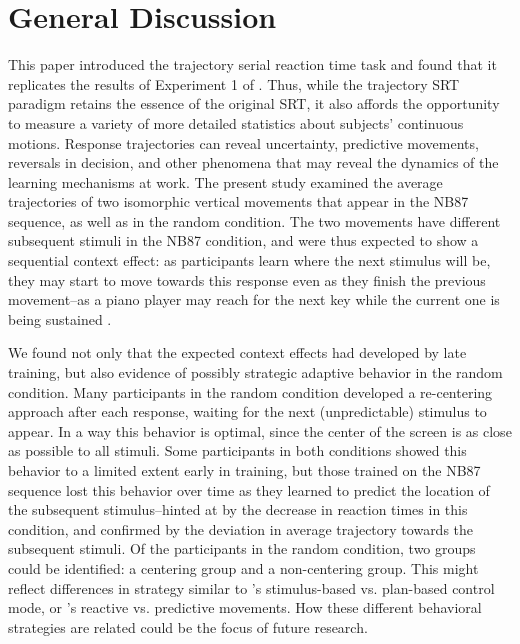 \documentclass[man,floatsintext]{apa6}
\begin{document}
\section{General Discussion}


This paper introduced the trajectory serial reaction time task and found that it replicates the results of Experiment 1 of . Thus, while the trajectory SRT paradigm retains the essence of the original SRT, it also affords the opportunity to measure a variety of more detailed statistics about subjects' continuous motions. Response trajectories can reveal uncertainty, predictive movements, reversals in decision, and other phenomena that may reveal the dynamics of the learning mechanisms at work. The present study examined the average trajectories of two isomorphic vertical movements that appear in the NB87 sequence, as well as in the random condition. The two movements have different subsequent stimuli in the NB87 condition, and were thus expected to show a sequential context effect: as participants learn where the next stimulus will be, they may start to move towards this response even as they finish the previous movement--as a piano player may reach for the next key while the current one is being sustained \cite{Soechting:1996}.

We found not only that the expected context effects had developed by late training, but also evidence of possibly strategic adaptive behavior in the random condition. Many participants in the random condition developed a re-centering approach after each response, waiting for the next (unpredictable) stimulus to appear. In a way this behavior is optimal, since the center of the screen is as close as possible to all stimuli. Some participants in both conditions showed this behavior to a limited extent early in training, but those trained on the NB87 sequence lost this behavior over time as they learned to predict the location of the subsequent stimulus--hinted at by the decrease in reaction times in this condition, and confirmed by the deviation in average trajectory towards the subsequent stimuli. Of the participants in the random condition, two groups could be identified: a centering group and a non-centering group. This might reflect differences in strategy similar to \citeauthor{Tubau:2007}'s \citeyear{Tubau:2007} stimulus-based vs. plan-based control mode, or \citeauthor{Dale:2012aa}'s \citeyear{Dale:2012aa} reactive vs. predictive movements. How these different behavioral strategies are related could be the focus of future research.
\end{document}

